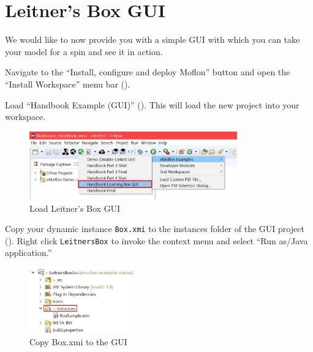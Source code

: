 \newpage
\chapter{Leitner's Box GUI}
\genHeader

We would like to now provide you with a simple GUI with which you can take your model for a spin and see it in action.

\begin{stepbystep}

\item Navigate to the ``Install, configure and deploy Moflon'' button and open the ``Install Workspace'' menu bar ().

\item Load ``Handbook Example (GUI)'' (). This will load the new project into your workspace. 

\begin{figure}[htbp]
    \centering
    \includegraphics[width=0.8\textwidth]{../../org.moflon.doc.handbook.02_leitnersLearningBox/6_LLBGui/guiImages/eclipse_loadGUI}
    \caption{Load Leitner's Box GUI}
    \label{eclipse:GUI_load}
\end{figure}

\item Copy your dynamic instance \texttt{Box.xmi} to the instances folder of the GUI project (). Right click \texttt{LeitnersBox} to invoke the context menu and select ``Run as/Java application.''

\begin{figure}[htbp]
    \centering
    \includegraphics[width=0.4\textwidth]{../../org.moflon.doc.handbook.02_leitnersLearningBox/6_LLBGui/guiImages/eclipse_copyBox}
    \caption{Copy Box.xmi to the GUI}
    \label{eclipse:Copy_instance}
\end{figure}


\end{stepbystep}
